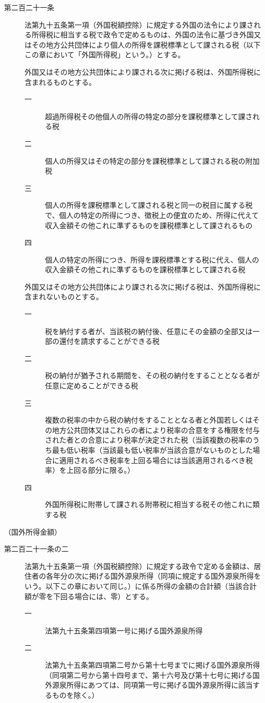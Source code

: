\documentclass[twocolumn,a4j,10pt]{ltjtarticle}
\begin{document}
\begin{description}
\item[第二百二十一条]法第九十五条第一項（外国税額控除）に規定する外国の法令により課される所得税に相当する税で政令で定めるものは、外国の法令に基づき外国又はその地方公共団体により個人の所得を課税標準として課される税（以下この章において「外国所得税」という。）とする。
\item[]外国又はその地方公共団体により課される次に掲げる税は、外国所得税に含まれるものとする。
\begin{description}
\item[一]超過所得税その他個人の所得の特定の部分を課税標準として課される税
\item[二]個人の所得又はその特定の部分を課税標準として課される税の附加税
\item[三]個人の所得を課税標準として課される税と同一の税目に属する税で、個人の特定の所得につき、徴税上の便宜のため、所得に代えて収入金額その他これに準ずるものを課税標準として課されるもの
\item[四]個人の特定の所得につき、所得を課税標準とする税に代え、個人の収入金額その他これに準ずるものを課税標準として課される税
\end{description}
\item[]外国又はその地方公共団体により課される次に掲げる税は、外国所得税に含まれないものとする。
\begin{description}
\item[一]税を納付する者が、当該税の納付後、任意にその金額の全部又は一部の還付を請求することができる税
\item[二]税の納付が猶予される期間を、その税の納付をすることとなる者が任意に定めることができる税
\item[三]複数の税率の中から税の納付をすることとなる者と外国若しくはその地方公共団体又はこれらの者により税率の合意をする権限を付与された者との合意により税率が決定された税（当該複数の税率のうち最も低い税率（当該最も低い税率が当該合意がないものとした場合に適用されるべき税率を上回る場合には当該適用されるべき税率）を上回る部分に限る。）
\item[四]外国所得税に附帯して課される附帯税に相当する税その他これに類する税
\end{description}
\end{description}
\noindent\hspace{10pt}（国外所得金額）
\begin{description}
\item[第二百二十一条の二]法第九十五条第一項（外国税額控除）に規定する政令で定める金額は、居住者の各年分の次に掲げる国外源泉所得（同項に規定する国外源泉所得をいう。以下この章において同じ。）に係る所得の金額の合計額（当該合計額が零を下回る場合には、零）とする。
\begin{description}
\item[一]法第九十五条第四項第一号に掲げる国外源泉所得
\item[二]法第九十五条第四項第二号から第十七号までに掲げる国外源泉所得（同項第二号から第十四号まで、第十六号及び第十七号に掲げる国外源泉所得にあつては、同項第一号に掲げる国外源泉所得に該当するものを除く。）
\end{description}
\end{description}
\end{document}

